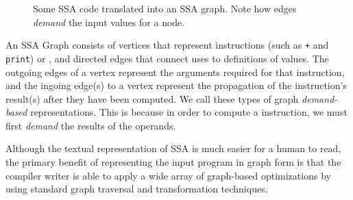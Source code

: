 \begin{figure}[ht]
\centering
{}


\caption{Some SSA code translated into an SSA graph. Note how edges \textit{demand} the input values for a node.}
\label{fig:ssa-graph-example-code}
\end{figure}

An SSA Graph consists of vertices that represent instructions (such as \texttt{+} and \texttt{print}) or \phifuns, and directed edges that connect uses to definitions of values. 
The outgoing edges of a vertex represent the arguments required for that instruction, and the ingoing edge(s) to a vertex represent the propagation of the instruction's result(s) after they have been computed. 
We call these types of graph \textit{demand-based} representations. 
This is because in order to compute a instruction, we must first \textit{demand} the results of the operands. 

Although the textual representation of SSA is much easier for a human to read, the primary benefit of representing the input program in graph form is that the compiler writer is able to apply a wide array of graph-based optimizations by using standard graph traversal and transformation techniques. 

